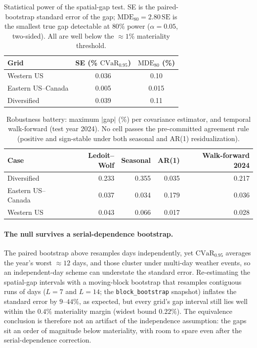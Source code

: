 \documentclass[12pt]{article}
\newcommand{\CVaR}{\mathrm{CVaR}}
\begin{document}
\begin{table}[h]
\centering\small
\caption{Statistical power of the spatial-gap test. SE is the paired-bootstrap
standard error of the gap; $\mathrm{MDE}_{80}=2.80\,\mathrm{SE}$ is the smallest
true gap detectable at $80\%$ power ($\alpha=0.05$, two-sided). All are well below
the $\approx1\%$ materiality threshold.}
\label{tab:power}
\begin{tabular}{lcc}
\toprule
Grid & SE (\% $\CVaR_{0.95}$) & $\mathrm{MDE}_{80}$ (\%)\\
\midrule
Western US        & 0.036 & 0.10\\
Eastern US--Canada & 0.005 & 0.015\\
Diversified       & 0.039 & 0.11\\
\bottomrule
\end{tabular}
\end{table}

\begin{table}[t]
\centering\small
\caption{Robustness battery: maximum $|$gap$|$ (\%) per covariance estimator, and
temporal walk-forward (test year 2024). No cell passes the pre-committed
agreement rule (positive and sign-stable under both seasonal and AR(1)
residualization).}
\label{tab:robust}
\begin{tabular}{lrrrr}
\toprule
Case & Ledoit--Wolf & Seasonal & AR(1) & Walk-forward 2024\\
\midrule
Diversified & 0.233 & 0.355 & 0.035 & 0.217\\
Eastern US--Canada      & 0.037 & 0.034 & 0.179 & 0.036\\
Western US   & 0.043 & 0.066 & 0.017 & 0.028\\
\bottomrule
\end{tabular}
\end{table}

\paragraph{The null survives a serial-dependence bootstrap.} The paired bootstrap above
resamples days independently, yet $\CVaR_{0.95}$ averages the year's worst ${\approx}12$
days, and those cluster under multi-day weather events, so an independent-day scheme can
understate the standard error. Re-estimating the spatial-gap intervals with a moving-block
bootstrap that resamples contiguous runs of days ($L=7$ and $L=14$;
the \texttt{block\_bootstrap} snapshot) inflates the standard error by $9$--$44\%$, as
expected, but every grid's gap interval still lies well within the $0.4\%$ materiality
margin (widest bound $0.22\%$). The equivalence conclusion is therefore not an artifact of
the independence assumption: the gaps sit an order of magnitude below materiality, with
room to spare even after the serial-dependence correction.
\end{document}
